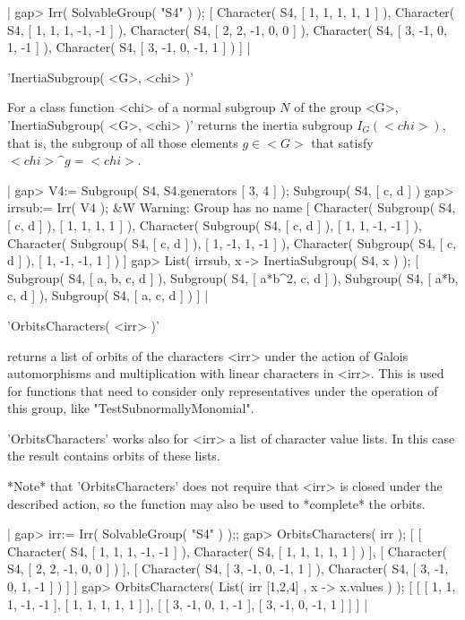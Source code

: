 |    gap> Irr( SolvableGroup( "S4" ) );
    [ Character( S4, [ 1, 1, 1, 1, 1 ] ), 
      Character( S4, [ 1, 1, 1, -1, -1 ] ), 
      Character( S4, [ 2, 2, -1, 0, 0 ] ), 
      Character( S4, [ 3, -1, 0, 1, -1 ] ), 
      Character( S4, [ 3, -1, 0, -1, 1 ] ) ] |


'InertiaSubgroup( <G>, <chi> )'

For a class function <chi> of a normal subgroup $N$ of the group <G>,
'InertiaSubgroup( <G>, <chi> )' returns the inertia subgroup $I_G(<chi>)$,
that is, the subgroup of all those elements $g \in <G>$ that satisfy
$<chi> \^ g = <chi>$.
 
|    gap> V4:= Subgroup( S4, S4.generators{ [ 3, 4 ] } );
    Subgroup( S4, [ c, d ] )
    gap> irrsub:= Irr( V4 );
    &W  Warning: Group has no name
    [ Character( Subgroup( S4, [ c, d ] ), [ 1, 1, 1, 1 ] ), 
      Character( Subgroup( S4, [ c, d ] ), [ 1, 1, -1, -1 ] ), 
      Character( Subgroup( S4, [ c, d ] ), [ 1, -1, 1, -1 ] ), 
      Character( Subgroup( S4, [ c, d ] ), [ 1, -1, -1, 1 ] ) ]
    gap> List( irrsub, x -> InertiaSubgroup( S4, x ) );
    [ Subgroup( S4, [ a, b, c, d ] ), Subgroup( S4, [ a*b^2, c, d ] ),
      Subgroup( S4, [ a*b, c, d ] ), Subgroup( S4, [ a, c, d ] ) ] |


'OrbitsCharacters( <irr> )'

returns a list of orbits of the characters <irr> under the action of
Galois automorphisms and multiplication with linear characters in <irr>.
This is used for functions that need to consider only representatives
under the operation of this group, like "TestSubnormallyMonomial".

'OrbitsCharacters' works also for <irr> a list of character value lists.
In this case the result contains orbits of these lists.

*Note* that 'OrbitsCharacters' does not require that <irr> is closed
under the described action, so the function may also be used to
*complete* the orbits.

|    gap> irr:= Irr( SolvableGroup( "S4" ) );;
    gap> OrbitsCharacters( irr );
    [ [ Character( S4, [ 1, 1, 1, -1, -1 ] ),
          Character( S4, [ 1, 1, 1, 1, 1 ] ) ],
      [ Character( S4, [ 2, 2, -1, 0, 0 ] ) ],
      [ Character( S4, [ 3, -1, 0, -1, 1 ] ),
          Character( S4, [ 3, -1, 0, 1, -1 ] ) ] ]
    gap> OrbitsCharacters( List( irr{ [1,2,4] }, x -> x.values ) );
    [ [ [ 1, 1, 1, -1, -1 ], [ 1, 1, 1, 1, 1 ] ],
      [ [ 3, -1, 0, 1, -1 ], [ 3, -1, 0, -1, 1 ] ] ] |

